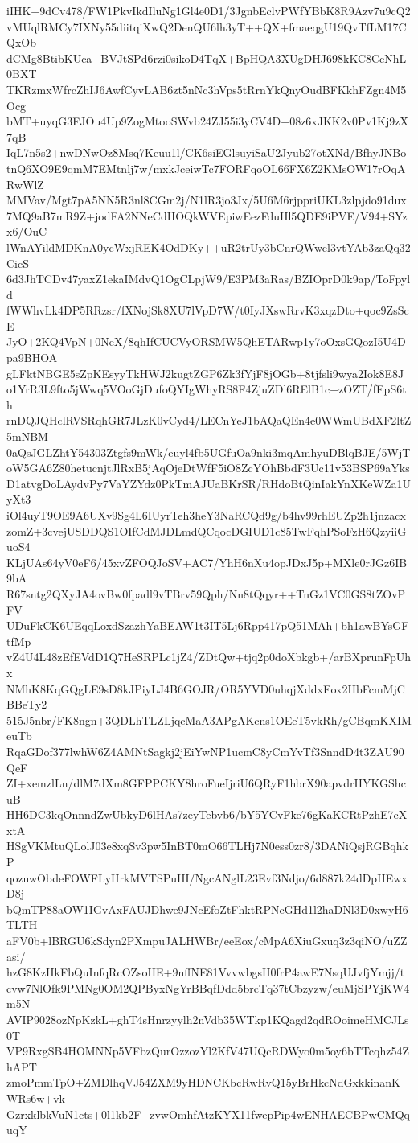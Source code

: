 iIHK+9dCv478/FW1PkvIkdIluNg1Gl4e0D1/3JgnbEclvPWfYBbK8R9Azv7u9cQ2
vMUqlRMCy7IXNy55diitqiXwQ2DenQU6lh3yT++QX+fmaeqgU19QvTfLM17CQxOb
dCMg8BtibKUca+BVJtSPd6rzi0sikoD4TqX+BpHQA3XUgDHJ698kKC8CcNhL0BXT
TKRzmxWfrcZhIJ6AwfCyvLAB6zt5nNc3hVps5tRrnYkQnyOudBFKkhFZgn4M5Ocg
bMT+uyqG3FJOu4Up9ZogMtooSWvb24ZJ55i3yCV4D+08z6xJKK2v0Pv1Kj9zX7qB
IqL7n5s2+nwDNwOz8Msq7Keuu1l/CK6siEGlsuyiSaU2Jyub27otXNd/BfhyJNBo
tnQ6XO9E9qmM7EMtnlj7w/mxkJceiwTc7FORFqoOL66FX6Z2KMsOW17rOqARwWlZ
MMVav/Mgt7pA5NN5R3nl8CGm2j/N1lR3jo3Jx/5U6M6rjppriUKL3zlpjdo91dux
7MQ9aB7mR9Z+jodFA2NNeCdHOQkWVEpiwEezFduHl5QDE9iPVE/V94+SYzx6/OuC
lWnAYildMDKnA0ycWxjREK4OdDKy++uR2trUy3bCnrQWwcl3vtYAb3zaQq32CicS
6d3JhTCDv47yaxZ1ekaIMdvQ1OgCLpjW9/E3PM3aRas/BZIOprD0k9ap/ToFpyld
fWWhvLk4DP5RRzsr/fXNojSk8XU7lVpD7W/t0IyJXswRrvK3xqzDto+qoc9ZsScE
JyO+2KQ4VpN+0NeX/8qhIfCUCVyORSMW5QhETARwp1y7oOxsGQozI5U4Dpa9BHOA
gLFktNBGE5sZpKEsyyTkHWJ2kugtZGP6Zk3fYjF8jOGb+8tjfsli9wya2Iok8E8J
o1YrR3L9fto5jWwq5VOoGjDufoQYIgWhyRS8F4ZjuZDl6RElB1c+zOZT/fEpS6th
rnDQJQHclRVSRqhGR7JLzK0vCyd4/LECnYeJ1bAQaQEn4e0WWmUBdXF2ltZ5mNBM
0aQsJGLZhtY54303Ztgfs9mWk/euyl4fb5UGfuOa9nki3mqAmhyuDBlqBJE/5WjT
oW5GA6Z80hetucnjtJlRxB5jAqOjeDtWfF5iO8ZcYOhBbdF3Uc11v53BSP69aYks
D1atvgDoLAydvPy7VaYZYdz0PkTmAJUaBKrSR/RHdoBtQinIakYnXKeWZa1UyXt3
iOl4uyT9OE9A6UXv9Sg4L6IUyrTeh3heY3NaRCQd9g/b4hv99rhEUZp2h1jnzacx
zomZ+3cvejUSDDQS1OIfCdMJDLmdQCqocDGIUD1c85TwFqhPSoFzH6QzyiiGuoS4
KLjUAs64yV0eF6/45xvZFOQJoSV+AC7/YhH6nXu4opJDxJ5p+MXle0rJGz6IB9bA
R67sntg2QXyJA4ovBw0fpadl9vTBrv59Qph/Nn8tQqyr++TnGz1VC0GS8tZOvPFV
UDuFkCK6UEqqLoxdSzazhYaBEAW1t3IT5Lj6Rpp417pQ51MAh+bh1awBYsGFtfMp
vZ4U4L48zEfEVdD1Q7HeSRPLc1jZ4/ZDtQw+tjq2p0doXbkgb+/arBXprunFpUhx
NMhK8KqGQgLE9sD8kJPiyLJ4B6GOJR/OR5YVD0uhqjXddxEox2HbFcmMjCBBeTy2
515J5nbr/FK8ngn+3QDLhTLZLjqcMaA3APgAKcns1OEeT5vkRh/gCBqmKXIMeuTb
RqaGDof377lwhW6Z4AMNtSagkj2jEiYwNP1ucmC8yCmYvTf3SnndD4t3ZAU90QeF
ZI+xemzlLn/dlM7dXm8GFPPCKY8hroFueIjriU6QRyF1hbrX90apvdrHYKGShcuB
HH6DC3kqOnnndZwUbkyD6lHAs7zeyTebvb6/bY5YCvFke76gKaKCRtPzhE7cXxtA
HSgVKMtuQLolJ03e8xqSv3pw5InBT0mO66TLHj7N0ess0zr8/3DANiQsjRGBqhkP
qozuwObdeFOWFLyHrkMVTSPuHI/NgcANglL23Evf3Ndjo/6d887k24dDpHEwxD8j
bQmTP88aOW1IGvAxFAUJDhwe9JNcEfoZtFhktRPNcGHd1l2haDNl3D0xwyH6TLTH
aFV0b+lBRGU6kSdyn2PXmpuJALHWBr/eeEox/cMpA6XiuGxuq3z3qiNO/uZZasi/
hzG8KzHkFbQuInfqRcOZsoHE+9nffNE81VvvwbgsH0frP4awE7NsqUJvfjYmjj/t
cvw7NlOfk9PMNg0OM2QPByxNgYrBBqfDdd5brcTq37tCbzyzw/euMjSPYjKW4m5N
AVIP9028ozNpKzkL+ghT4sHnrzyylh2nVdb35WTkp1KQagd2qdROoimeHMCJLs0T
VP9RxgSB4HOMNNp5VFbzQurOzzozYl2KfV47UQcRDWyo0m5oy6bTTcqhz54ZhAPT
zmoPmmTpO+ZMDlhqVJ54ZXM9yHDNCKbcRwRvQ15yBrHkcNdGxkkinanKWRs6w+vk
GzrxklbkVuN1cts+0l1kb2F+zvwOmhfAtzKYX11fwepPip4wENHAECBPwCMQquqY

